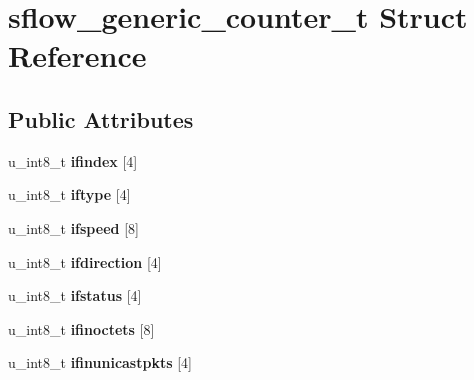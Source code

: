 \hypertarget{structsflow__generic__counter__t}{
\section{sflow\_\-generic\_\-counter\_\-t Struct Reference}
\label{structsflow__generic__counter__t}
}
\subsection*{Public Attributes}
\begin{DoxyCompactItemize}
\item 
\hypertarget{structsflow__generic__counter__t_a6956689ec6c0611868b1ab8e87c6d899}{
u\_\-int8\_\-t {\bfseries ifindex} \mbox{[}4\mbox{]}}
\label{structsflow__generic__counter__t_a6956689ec6c0611868b1ab8e87c6d899}

\item 
\hypertarget{structsflow__generic__counter__t_ae283922858b7bb85c4a4328d07d4b773}{
u\_\-int8\_\-t {\bfseries iftype} \mbox{[}4\mbox{]}}
\label{structsflow__generic__counter__t_ae283922858b7bb85c4a4328d07d4b773}

\item 
\hypertarget{structsflow__generic__counter__t_a9428381d217d0e792c568b3319db0890}{
u\_\-int8\_\-t {\bfseries ifspeed} \mbox{[}8\mbox{]}}
\label{structsflow__generic__counter__t_a9428381d217d0e792c568b3319db0890}

\item 
\hypertarget{structsflow__generic__counter__t_ab03f5eaaec4c73c0f062b8a41f38b7f5}{
u\_\-int8\_\-t {\bfseries ifdirection} \mbox{[}4\mbox{]}}
\label{structsflow__generic__counter__t_ab03f5eaaec4c73c0f062b8a41f38b7f5}

\item 
\hypertarget{structsflow__generic__counter__t_a876b4a5f85077965650126ed8202d123}{
u\_\-int8\_\-t {\bfseries ifstatus} \mbox{[}4\mbox{]}}
\label{structsflow__generic__counter__t_a876b4a5f85077965650126ed8202d123}

\item 
\hypertarget{structsflow__generic__counter__t_a74b3c1de0ff87cd917e4782a039c831a}{
u\_\-int8\_\-t {\bfseries ifinoctets} \mbox{[}8\mbox{]}}
\label{structsflow__generic__counter__t_a74b3c1de0ff87cd917e4782a039c831a}

\item 
\hypertarget{structsflow__generic__counter__t_a1e04463bed7466442bf2a41bf2795763}{
u\_\-int8\_\-t {\bfseries ifinunicastpkts} \mbox{[}4\mbox{]}}
\label{structsflow__generic__counter__t_a1e04463bed7466442bf2a41bf2795763}


\end{DoxyCompactItemize}
